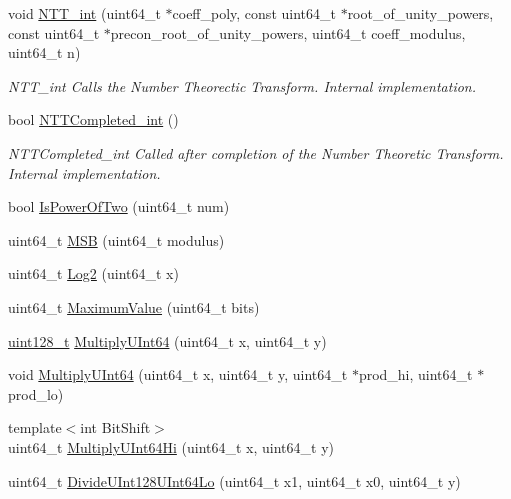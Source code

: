 \begin{DoxyCompactItemize}
void \hyperlink{namespaceintel_1_1hexl_1_1fpga_a18d9571a62d998d2b64c302343c623b9}{N\-T\-T\-\_\-int} (uint64\-\_\-t $\ast$coeff\-\_\-poly, const uint64\-\_\-t $\ast$root\-\_\-of\-\_\-unity\-\_\-powers, const uint64\-\_\-t $\ast$precon\-\_\-root\-\_\-of\-\_\-unity\-\_\-powers, uint64\-\_\-t coeff\-\_\-modulus, uint64\-\_\-t n)
\begin{DoxyCompactList}\small\item\em N\-T\-T\-\_\-int Calls the Number Theorectic Transform. Internal implementation. \end{DoxyCompactList}\item 
bool \hyperlink{namespaceintel_1_1hexl_1_1fpga_a9cf08769dd3a7d8ea67fd03c69067d91}{N\-T\-T\-Completed\-\_\-int} ()
\begin{DoxyCompactList}\small\item\em N\-T\-T\-Completed\-\_\-int Called after completion of the Number Theoretic Transform. Internal implementation. \end{DoxyCompactList}\item 
bool \hyperlink{namespaceintel_1_1hexl_1_1fpga_a1e16bb896a629eb017fc92f87fe9b8d1}{Is\-Power\-Of\-Two} (uint64\-\_\-t num)
\item 
uint64\-\_\-t \hyperlink{namespaceintel_1_1hexl_1_1fpga_ab2af2089c7624a4f2f6bb86a7744e6a1}{M\-S\-B} (uint64\-\_\-t modulus)
\item 
uint64\-\_\-t \hyperlink{namespaceintel_1_1hexl_1_1fpga_afcbeef9c605f8d1384004d4a736d1e37}{Log2} (uint64\-\_\-t x)
\item 
uint64\-\_\-t \hyperlink{namespaceintel_1_1hexl_1_1fpga_a5da7e2d76836d01351cc264ac98ca1f2}{Maximum\-Value} (uint64\-\_\-t bits)
\item 
\hyperlink{namespaceintel_1_1hexl_1_1fpga_a855c40574416e25f94fb6b7817c2c4f3}{uint128\-\_\-t} \hyperlink{namespaceintel_1_1hexl_1_1fpga_abc78d586df607b1930db2e69ea14f1dc}{Multiply\-U\-Int64} (uint64\-\_\-t x, uint64\-\_\-t y)
\item 
void \hyperlink{namespaceintel_1_1hexl_1_1fpga_a7ecaf4450f87d40067692edd70725474}{Multiply\-U\-Int64} (uint64\-\_\-t x, uint64\-\_\-t y, uint64\-\_\-t $\ast$prod\-\_\-hi, uint64\-\_\-t $\ast$prod\-\_\-lo)
\item 
{\footnotesize template$<$int Bit\-Shift$>$ }\\uint64\-\_\-t \hyperlink{namespaceintel_1_1hexl_1_1fpga_a885fc322b5c2559feed13fdf5ded1660}{Multiply\-U\-Int64\-Hi} (uint64\-\_\-t x, uint64\-\_\-t y)
\item 
uint64\-\_\-t \hyperlink{namespaceintel_1_1hexl_1_1fpga_aef53989a5c9adf16fcc5d0a188fa2abf}{Divide\-U\-Int128\-U\-Int64\-Lo} (uint64\-\_\-t x1, uint64\-\_\-t x0, uint64\-\_\-t y)

\end{DoxyCompactItemize}
